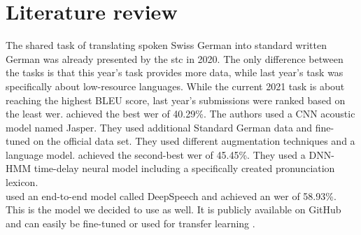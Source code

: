\section{Literature review}
The shared task of translating spoken Swiss German into standard written German was already presented by the \gls{stc} in 2020. The only difference between the tasks is that this year's task provides
more data, while last year's task was specifically about low-resource languages. While the current 2021 task is about reaching the highest BLEU score, last year's submissions were ranked based on the
least \gls{wer}. \citet{buechi2020} achieved the best \gls{wer} of 40.29\%. The authors used a CNN acoustic model named Jasper. They used additional Standard German data and fine-tuned on the official
data set. They used different augmentation techniques and a language model. \citet{Kew2020} achieved the second-best \gls{wer} of 45.45\%. They used a DNN-HMM time-delay neural model including a specifically created pronunciation lexicon.   \\
\citet{Agarwal2020LTLUDEAL} used an end-to-end model called DeepSpeech and achieved an \gls{wer} of 58.93\%. This is the model we decided to use as well. It is publicly available on GitHub and can easily be fine-tuned or used for transfer learning \cite{pluss2020}.

